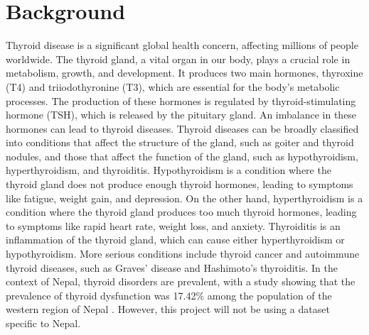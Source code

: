 \section{Background}\label{sec:bkgrnd}%
Thyroid disease is a significant global health concern, affecting millions of people worldwide. The thyroid gland, a vital organ in our body, plays a crucial role in metabolism, growth, and development. It produces two main hormones, thyroxine (T4) and triiodothyronine (T3), which are essential for the body's metabolic processes. The production of these hormones is regulated by thyroid-stimulating hormone (TSH), which is released by the pituitary gland. An imbalance in these hormones can lead to thyroid diseases.
Thyroid diseases can be broadly classified into conditions that affect the structure of the gland, such as goiter and thyroid nodules, and those that affect the function of the gland, such as hypothyroidism, hyperthyroidism, and thyroiditis. Hypothyroidism is a condition where the thyroid gland does not produce enough thyroid hormones, leading to symptoms like fatigue, weight gain, and depression. On the other hand, hyperthyroidism is a condition where the thyroid gland produces too much thyroid hormones, leading to symptoms like rapid heart rate, weight loss, and anxiety. Thyroiditis is an inflammation of the thyroid gland, which can cause either hyperthyroidism or hypothyroidism. More serious conditions include thyroid cancer and autoimmune thyroid diseases, such as Graves' disease and Hashimoto's thyroiditis.
In the context of Nepal, thyroid disorders are prevalent, with a study showing that the prevalence of thyroid dysfunction was 17.42\% among the population of the western region of Nepal \cite{yadav2013}. However, this project will not be using a dataset specific to Nepal.

